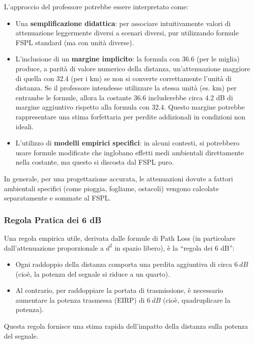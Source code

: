L'approccio del professore potrebbe essere interpretato come:
\begin{itemize}
    \item Una \textbf{semplificazione didattica}: per associare intuitivamente valori di attenuazione leggermente diversi a scenari diversi, pur utilizzando formule FSPL standard (ma con unità diverse).
    \item L'inclusione di un \textbf{margine implicito}: la formula con 36.6 (per le miglia) produce, a parità di valore numerico della distanza, un'attenuazione maggiore di quella con 32.4 (per i km) se non si converte correttamente l'unità di distanza. Se il professore intendesse utilizzare la stessa unità (es. km) per entrambe le formule, allora la costante 36.6 includerebbe circa 4.2 dB di margine aggiuntivo rispetto alla formula con 32.4. Questo margine potrebbe rappresentare una stima forfettaria per perdite addizionali in condizioni non ideali.
    \item L'utilizzo di \textbf{modelli empirici specifici}: in alcuni contesti, si potrebbero usare formule modificate che inglobano effetti medi ambientali direttamente nella costante, ma questo si discosta dal FSPL puro.
\end{itemize}
In generale, per una progettazione accurata, le attenuazioni dovute a fattori ambientali specifici (come pioggia, fogliame, ostacoli) vengono calcolate separatamente e sommate al FSPL.

\subsubsection{Regola Pratica dei 6 dB}
Una regola empirica utile, derivata dalle formule di Path Loss (in particolare dall'attenuazione proporzionale a $d^2$ in spazio libero), è la ``regola dei 6 dB'':
\begin{itemize}
    \item Ogni raddoppio della distanza comporta una perdita aggiuntiva di circa $\SI{6}{dB}$ (cioè, la potenza del segnale si riduce a un quarto).
    \item Al contrario, per raddoppiare la portata di trasmissione, è necessario aumentare la potenza trasmessa (EIRP) di $\SI{+6}{dB}$ (cioè, quadruplicare la potenza).
\end{itemize}
Questa regola fornisce una stima rapida dell'impatto della distanza sulla potenza del segnale.

